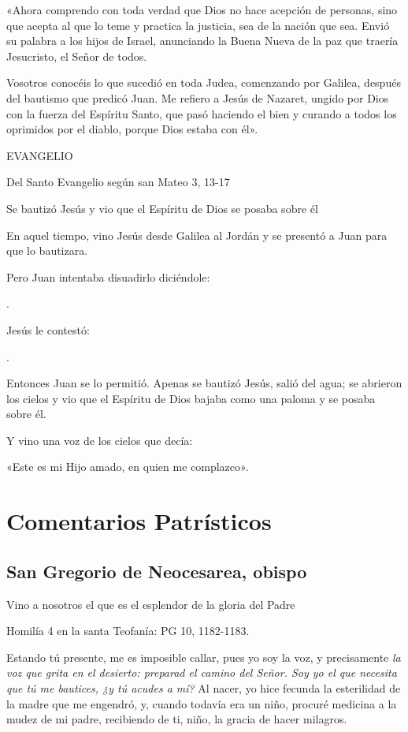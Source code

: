{«Ahora comprendo con toda verdad que Dios no hace acepción de personas,
sino que acepta al que lo teme y practica la justicia, sea de la nación
que sea. Envió su palabra a los hijos de Israel, anunciando la Buena
Nueva de la paz que traería Jesucristo, el Señor de todos.

Vosotros conocéis lo que sucedió en toda Judea, comenzando por Galilea,
después del bautismo que predicó Juan. Me refiero a Jesús de Nazaret,
ungido por Dios con la fuerza del Espíritu Santo, que pasó haciendo el
bien y curando a todos los oprimidos por el diablo, porque Dios estaba
con él».

EVANGELIO

Del Santo Evangelio según san Mateo 3, 13-17

Se bautizó Jesús y vio que el Espíritu de Dios se posaba sobre él

En aquel tiempo, vino Jesús desde Galilea al Jordán y se presentó a Juan
para que lo bautizara.

Pero Juan intentaba disuadirlo diciéndole:

.

Jesús le contestó:

.

Entonces Juan se lo permitió. Apenas se bautizó Jesús, salió del agua;
se abrieron los cielos y vio que el Espíritu de Dios bajaba como una
paloma y se posaba sobre él.

Y vino una voz de los cielos que decía:

«Este es mi Hijo amado, en quien me
complazco».

\section{Comentarios Patrísticos}

\subsection{San Gregorio de Neocesarea, obispo}

Vino a nosotros el que es el esplendor de la gloria del Padre

Homilía 4 en la santa Teofanía: PG 10, 1182-1183.

Estando tú presente, me es imposible callar, pues yo soy la voz, y precisamente \emph{la voz que grita en el desierto: preparad el camino del Señor. Soy yo el que necesita que tú me bautices, ¿y tú acudes a mí?} Al nacer, yo hice fecunda la esterilidad de la madre que me engendró, y, cuando todavía era un niño, procuré medicina a la mudez de mi padre, recibiendo de ti, niño, la gracia de hacer milagros.

}

